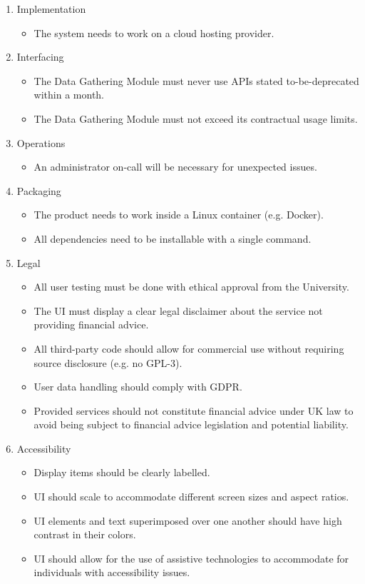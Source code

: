 \documentclass[main.tex]{subfiles}
\begin{document}
\begin{enumerate}
\begin{itemize}
   \end{itemize}
    \item Implementation
      \begin{itemize}
     \item The system needs to work on a cloud hosting provider.
   \end{itemize}
    \item Interfacing
      \begin{itemize}
     \item The Data Gathering Module must never use APIs stated to-be-deprecated within a month.
     \item The Data Gathering Module must not exceed its contractual usage limits.
   \end{itemize}
   \item Operations
      \begin{itemize}
     \item An administrator on-call will be necessary for unexpected issues.
   \end{itemize}
    \item Packaging
      \begin{itemize}
     \item The product needs to work inside a Linux container (e.g. Docker).
     \item All dependencies need to be installable with a single command.
   \end{itemize}
    \item Legal
      \begin{itemize}
     \item All user testing must be done with ethical approval from the University.
     \item The UI must display a clear legal disclaimer about the service not providing financial advice.
     \item All third-party code should allow for commercial use without requiring source disclosure (e.g. no GPL-3).
     \item User data handling should comply with GDPR.
     \item Provided services should not constitute financial advice under UK law to avoid being subject to financial advice legislation and potential liability.
   \end{itemize}
    \item Accessibility
      \begin{itemize}
     \item Display items should be clearly labelled.
     \item UI should scale to accommodate different screen sizes and aspect ratios.
     \item UI elements and text superimposed over one another should have high contrast in their colors.
     \item UI should allow for the use of assistive technologies to accommodate for individuals with accessibility issues.
   \end{itemize}
\end{enumerate}
\end{document}
